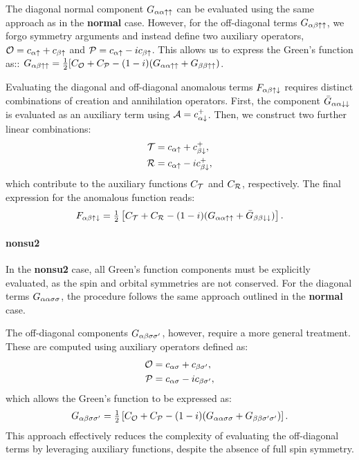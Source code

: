 \documentclass[edipack2.tex]{subfiles}
\begin{document}
The diagonal normal component $G_{\alpha\alpha\uparrow\uparrow}$ can be 
evaluated using the same approach as in the {\bf normal} 
case. However, for the off-diagonal terms $G_{\alpha\beta\uparrow\uparrow}$, 
we forgo symmetry arguments and instead define two 
auxiliary operators, ${\cal O} = c_{\alpha\uparrow} + c_{\beta\uparrow}$ and 
${\cal P} = c_{\alpha\uparrow} - i c_{\beta\uparrow}$. This allows us to express 
the Green's function as::
$G_{\alpha\beta\uparrow\uparrow}=\tfrac{1}{2}[C_{\cal O} + C_{\cal P} -
(1-i)(G_{\alpha\alpha\uparrow\uparrow}+G_{\beta\beta\uparrow\uparrow})$.

Evaluating the diagonal and off-diagonal anomalous terms 
$F_{\alpha\beta\uparrow\downarrow}$ requires distinct combinations of 
creation and annihilation operators. First, the component 
$\bar{G}_{\alpha\alpha\downarrow\downarrow}$ is evaluated as an auxiliary term 
using ${\cal A} = c^+_{\alpha\downarrow}$. Then, we construct two further 
linear combinations:
\begin{align*}
{\cal T} &= c_{\alpha\uparrow} + c^+_{\beta\downarrow}, \\
{\cal R} &= c_{\alpha\uparrow} - i c^+_{\beta\downarrow},
\end{align*}
which contribute to the auxiliary functions $C_{\cal T}$ and 
$C_{\cal R}$, respectively. The final expression for the 
anomalous function reads:
\begin{equation}
F_{\alpha\beta\uparrow\downarrow} = \tfrac{1}{2} \left[ C_{\cal T} + C_{\cal R} - 
(1-i)(G_{\alpha\alpha\uparrow\uparrow} + \bar{G}_{\beta\beta\downarrow\downarrow}) \right].
\end{equation}



\paragraph{{\bf nonsu2}}
In the {\bf nonsu2} case, all Green's function components 
must be explicitly evaluated, as the spin and orbital 
symmetries are not conserved. For the diagonal terms 
$G_{\alpha\alpha\sigma\sigma}$, the procedure follows the same approach 
outlined in the {\bf normal} case. 

The off-diagonal components $G_{\alpha\beta\sigma\sigma'}$, however, 
require a more general treatment. These are computed using 
auxiliary operators defined as:
\begin{align*}
{\cal O} &= c_{\alpha\sigma} + c_{\beta\sigma'}, \\
{\cal P} &= c_{\alpha\sigma} - i c_{\beta\sigma'},
\end{align*}
which allows the Green's function to be expressed as:
\begin{equation}
G_{\alpha\beta\sigma\sigma'} = \tfrac{1}{2} \left[ C_{\cal O} + C_{\cal P} - 
(1-i)(G_{\alpha\alpha\sigma\sigma} + G_{\beta\beta\sigma'\sigma'}) \right].
\end{equation}
This approach effectively reduces the complexity of 
evaluating the off-diagonal terms by leveraging auxiliary 
functions, despite the absence of full spin symmetry.
\end{document}
